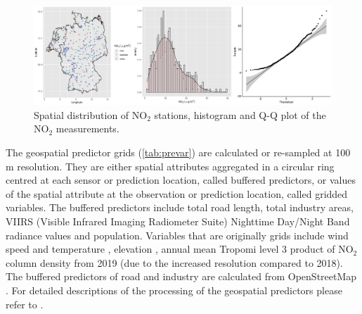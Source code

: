 \documentclass{article}
\begin{document}
\begin{figure}
    \centering
    \includegraphics[scale=0.06]{fig/histqq_NO2.png}
    \caption{Spatial distribution of NO$_2$ stations, histogram and Q-Q plot of the NO$_2$ measurements.}
    \label{fig:histqq}
\end{figure}{}

The geospatial predictor grids (\cref{tab:prevar}) are calculated or re-sampled at 100 m resolution. They are either spatial attributes aggregated in a circular ring centred at each sensor or prediction location, called buffered predictors, or values of the spatial attribute at the observation or prediction location, called gridded variables. The buffered predictors include total road length, total industry areas, VIIRS (Visible Infrared Imaging Radiometer Suite) Nighttime Day/Night Band radiance values \citep[nightlight,][]{nightlight} and population. Variables that are originally grids include wind speed and temperature \citep{dee2011era}, elevation \citep{elevation}, annual mean Tropomi level 3 product of NO$_2$ column density  \citep{TROPOMIgee} from 2019 (due to the increased resolution compared to 2018). The buffered predictors of road and industry are calculated from OpenStreetMap  \citep{openstreetmap}. For detailed descriptions of the processing of the geospatial predictors please refer to \cite{luglobal}.   
\end{document}
